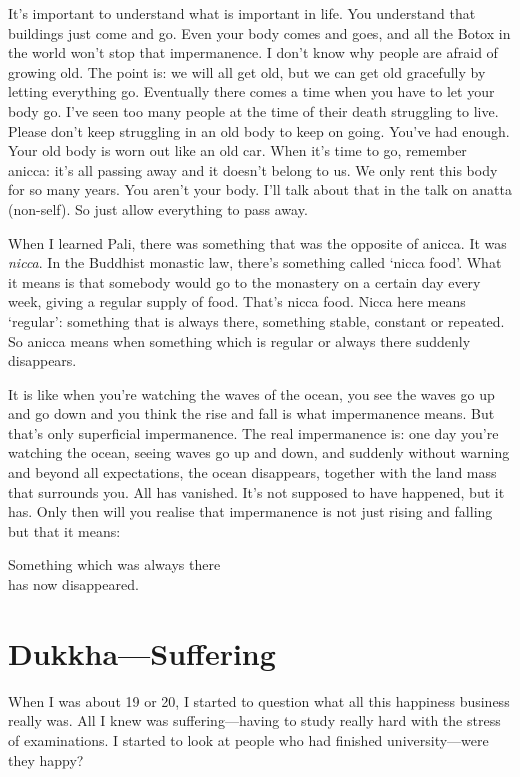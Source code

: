 \documentclass[12pt, openany]{book}
\newenvironment{aphorism}%
{%
\begin{center}\begin{itshape}
}%
{\end{itshape}\end{center}
}%
\newcommand{\fleuron}{%
\begin{center}
\vspace{2em}
\fallbackfont{❦}
\end{center}
}
\begin{document}
It’s important to understand what is important in life. You understand that buildings just come and go. Even your body comes and goes, and all the Botox in the world won’t stop that impermanence. I don’t know why people are afraid of growing old. The point is: we will all get old, but we can get old gracefully by letting everything go. Eventually there comes a time when you have to let your body go. I’ve seen too many people at the time of their death struggling to live. Please don’t keep struggling in an old body to keep on going. You’ve had enough. Your old body is worn out like an old car. When it’s time to go, remember anicca: it’s all passing away and it doesn’t belong to us. We only rent this body for so many years. You aren’t your body. I’ll talk about that in the talk on anatta (non-self). So just allow everything to pass away. 

When I learned Pali, there was something that was the opposite of anicca. It was \emph{nicca}. In the Buddhist monastic law, there’s something called ‘nicca food’. What it means is that somebody would go to the monastery on a certain day every week, giving a regular supply of food. That’s nicca food. Nicca here means ‘regular’: something that is always there, something stable, constant or repeated. So anicca means when something which is regular or always there suddenly disappears. 

It is like when you’re watching the waves of the ocean, you see the waves go up and go down and you think the rise and fall is what impermanence means. But that’s only superficial impermanence. The real impermanence is: one day you’re watching the ocean, seeing waves go up and down, and suddenly without warning and beyond all expectations, the ocean disappears, together with the land mass that surrounds you. All has vanished. It’s not supposed to have happened, but it has. Only then will you realise that impermanence is not just rising and falling but that it means: 

\begin{aphorism}
Something which was always there\\  
has now disappeared.
\end{aphorism}

\fleuron

\chapter{Dukkha—Suffering} 

When I was about 19 or 20, I started to question what all this happiness business really was. All I knew was suffering—having to study really hard with the stress of examinations. I started to look at people who had finished university—were they happy? 
\end{document}
